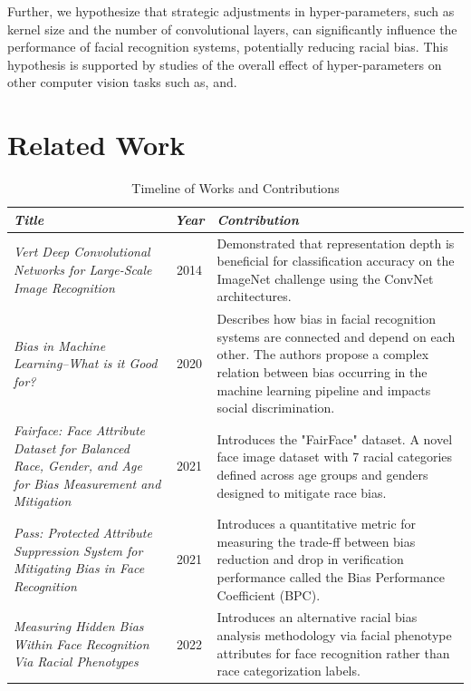 \documentclass[conference]{IEEEtran}
\begin{document}
Further, we hypothesize that strategic adjustments in hyper-parameters, such as kernel size and the number of convolutional layers, can significantly influence the performance of facial recognition systems, potentially reducing racial bias. This hypothesis is supported by studies of the overall effect of hyper-parameters on other computer vision tasks such as, \cite{simonyan2014very} and\cite{10.1016/j.jksuci.2022.06.007}.

\section{Related Work}

\begin{table}[!ht]
\caption{Timeline of Works and Contributions}
\centering
\begin{tabular}{|p{7cm}|c|p{9cm}|}
\hline
\textbf{\textit{Title}} & \textbf{\textit{Year}} & \textbf{\textit{Contribution}} \\
\hline
\textit{Vert Deep Convolutional Networks for Large-Scale Image Recognition}\cite{simonyan2014very} & 2014 & Demonstrated that representation depth is beneficial for classification accuracy on the ImageNet challenge using the ConvNet architectures. \\
\hline
\textit{Bias in Machine Learning--What is it Good for?} \cite{hellstrom2020bias} & 2020 & Describes how bias in facial recognition systems are connected and depend on each other. The authors propose a complex relation between bias occurring in the machine learning pipeline and impacts social discrimination. \\
\hline
\textit{Fairface: Face Attribute Dataset for Balanced Race, Gender, and Age for Bias Measurement and Mitigation} 
\cite{karkkainen2021fairface} & 2021 & Introduces the "FairFace" dataset. A novel face image dataset with 7 racial categories defined across age groups and genders designed to mitigate race bias. \\
\hline
\textit{Pass: Protected Attribute Suppression System for Mitigating Bias in Face Recognition}\cite{dhar2021pass} & 2021 & Introduces a quantitative metric for measuring the trade-ff between bias reduction and drop in verification performance called the Bias Performance Coefficient (BPC). \\
\hline
\textit{Measuring Hidden Bias Within Face Recognition Via Racial Phenotypes} \cite{yucer2022measuring} & 2022 & Introduces an alternative racial bias analysis methodology via facial phenotype attributes for face recognition rather than race categorization labels.  \\

\end{tabular}
\end{table}
\end{document}
